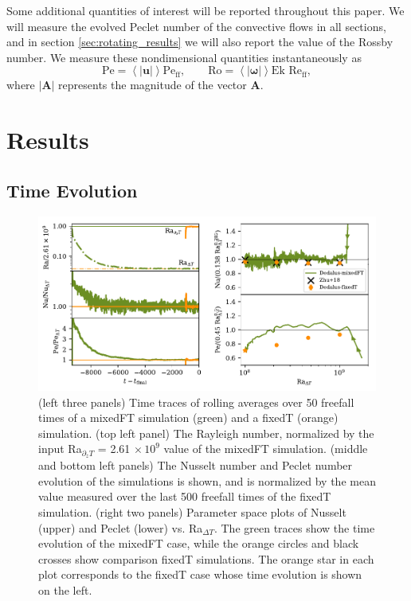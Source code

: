 \documentclass[aps, pre, onecolumn, nofootinbib, notitlepage, groupedaddress, amsfonts, amssymb, amsmath, longbibliography]{revtex4-1}
\newcommand{\angles}[1]{\ensuremath{\left\langle #1 \right\rangle}}
\newcommand{\Reff}{\ensuremath{\text{Re}_{\text{ff}}}}
\newcommand{\Peff}{\ensuremath{\text{Pe}_{\text{ff}}}}
\begin{document}
Some additional quantities of interest will be reported throughout this paper.
We will measure the evolved Peclet number of the convective flows in all sections, and in section \ref{sec:rotating_results} we will also report the value of the Rossby number.
We measure these nondimensional quantities instantaneously as
\begin{equation}
\text{Pe} = \angles{|\bm{u}|}\Peff,\qquad \text{Ro} = \angles{|\bm{\omega}|}\text{Ek }\Reff,
\end{equation}
where $|\bm{A}|$ represents the magnitude of the vector $\bm{A}$.





\section{Results}
\label{sec:2d_results}

\subsection{Time Evolution}

\begin{figure}
\includegraphics[width=\textwidth]{./figs/rbc_scalar_comparisons.pdf}
\caption{ 
	(left three panels) Time traces of rolling averages over 50 freefall times of a mixedFT simulation (green) and a fixedT (orange) simulation.
	(top left panel) The Rayleigh number, normalized by the input Ra$_{\partial_z T}$ = 2.61$\,\times 10^9$ value of the mixedFT simulation.
	(middle and bottom left panels) The Nusselt number and Peclet number evolution of the simulations is shown, and is normalized by the mean value measured over the last 500 freefall times of the fixedT simulation.
	(right two panels) Parameter space plots of Nusselt (upper) and Peclet (lower) vs. Ra$_{\Delta T}$.
	The green traces show the time evolution of the mixedFT case, while the orange circles and black crosses show comparison fixedT simulations.
	The orange star in each plot corresponds to the fixedT case whose time evolution is shown on the left.
\label{fig:rbc_scalar_comparisons} }
\end{figure}
\end{document}
